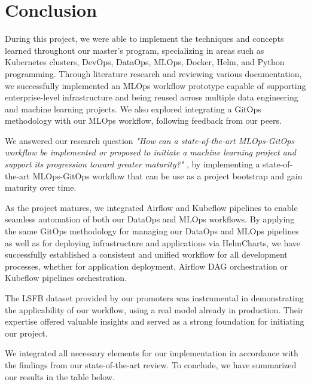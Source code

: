 \section{Conclusion}\label{sec:conclusion}

During this project, we were able to implement the techniques and concepts learned throughout our master's program, specializing in areas such as Kubernetes clusters, DevOps, DataOps, MLOps, Docker, Helm, and Python programming.
Through literature research and reviewing various documentation, we successfully implemented an MLOps workflow prototype capable of supporting enterprise-level infrastructure and being reused across multiple data engineering and machine learning projects.
We also explored integrating a GitOps methodology with our MLOps workflow, following feedback from our peers.

We answered our research question \textit{"How can a state-of-the-art MLOps-GitOps workflow be implemented or proposed to initiate a machine learning project and support its progression toward greater maturity?"}
, by implementing a state-of-the-art MLOps-GitOps workflow that can be use as a project bootstrap and gain maturity over time.

As the project matures, we integrated Airflow and Kubeflow pipelines to enable seamless automation of both our DataOps and MLOps workflows.
By applying the same GitOps methodology for managing our DataOps and MLOps pipelines as well as for deploying infrastructure and applications via HelmCharts,
we have successfully established a consistent and unified workflow for all development processes, whether for application deployment, Airflow DAG orchestration or Kubeflow pipelines orchestration.

The LSFB dataset provided by our promoters was instrumental in demonstrating the applicability of our workflow, using a real model already in production.
Their expertise offered valuable insights and served as a strong foundation for initiating our project.

We integrated all necessary elements for our implementation in accordance with the findings from our state-of-the-art review.
To conclude, we have summarized our results in the table below.

